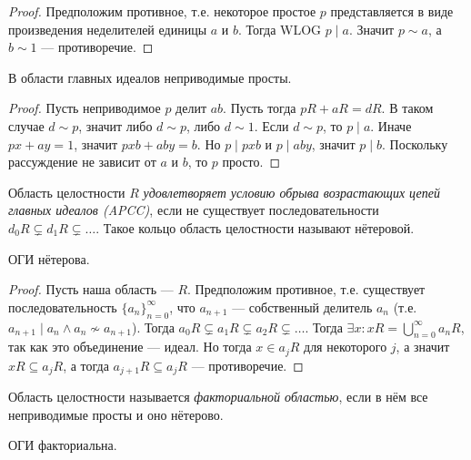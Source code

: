 \documentclass[12pt,a4paper]{article}
\begin{document}
    \begin{proof}
        Предположим противное, т.е. некоторое простое $p$ представляется в виде произведения неделителей единицы $a$ и $b$. Тогда WLOG $p \mid a$. Значит $p\sim a$, а $b \sim 1$ --- противоречие.
    \end{proof}

    \begin{statement}
        В области главных идеалов неприводимые просты.
    \end{statement}

    \begin{proof}
        Пусть неприводимое $p$ делит $ab$. Пусть тогда $pR + aR = dR$. В таком случае $d \sim p$, значит либо $d \sim p$, либо $d \sim 1$. Если $d \sim p$, то $p \mid a$. Иначе $px + ay = 1$, значит $pxb + aby = b$. Но $p \mid pxb$ и $p \mid aby$, значит $p \mid b$. Поскольку рассуждение не зависит от $a$ и $b$, то $p$ просто.  
    \end{proof}

    \begin{definition}
        Область целостности $R$ \emph{удовлетворяет условию обрыва возрастающих цепей главных идеалов (APCC)}, если не существует последовательности $d_0 R \subsetneq d_1 R \subsetneq \dots$. Такое кольцо область целостности называют нётеровой.
    \end{definition}

    \begin{theorem}
        ОГИ нётерова.
    \end{theorem}

    \begin{proof}
        Пусть наша область --- $R$. Предположим противное, т.е. существует последовательность $\{a_n\}_{n=0}^\infty$, что $a_{n+1}$ --- собственный делитель $a_n$ (т.е. $a_{n+1} \mid a_n \wedge a_n \nsim a_{n+1}$). Тогда $a_0 R \subsetneq a_1 R \subsetneq a_2 R \subsetneq \dots$. Тогда $\exists x: xR = \bigcup_{n=0}^\infty a_n R$, так как  это объединение --- идеал. Но тогда $x \in a_j R$ для некоторого $j$, а значит $x R \subseteq a_j R$, а тогда $a_{j+1} R \subseteq a_j R$ --- противоречие.
    \end{proof}

    \begin{definition}
        Область целостности называется \emph{факториальной областью}, если в нём все неприводимые просты и оно нётерово.
    \end{definition}

    \begin{example}
        ОГИ факториальна.
    \end{example}
\end{document}
